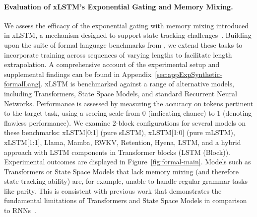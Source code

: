 \paragraph{Evaluation of xLSTM's Exponential Gating and Memory Mixing.} We assess the efficacy of the exponential gating with memory mixing introduced in xLSTM, a mechanism designed to support state tracking challenges~\citep{Merrill:24, Merrill:23}. Building upon the suite of formal language benchmarks from \citet{Deletang:23}, we extend these tasks to incorporate training across sequences of varying lengths to facilitate length extrapolation. A comprehensive account of the experimental setup and supplemental findings can be found in Appendix~\ref{sec:appExpSynthetic-formalLang}. xLSTM is benchmarked against a range of alternative models, including Transformers, State Space Models, and standard Recurrent Neural Networks. Performance is assessed by measuring the accuracy on tokens pertinent to the target task, using a scoring scale from 0 (indicating chance) to 1 (denoting flawless performance). We examine 2-block configurations for several models on these benchmarks: xLSTM[0:1] (pure sLSTM), xLSTM[1:0] (pure mLSTM), xLSTM[1:1], Llama, Mamba, RWKV, Retention, Hyena, LSTM, and a hybrid approach with LSTM components in Transformer blocks (LSTM (Block)). Experimental outcomes are displayed in Figure~\ref{fig:formal-main}. Models such as Transformers or State Space Models that lack memory mixing (and therefore state tracking ability) are, for example, unable to handle regular grammar tasks like parity. This is consistent with previous work that demonstrates the fundamental limitations of Transformers and State Space Models in comparison to RNNs~\citep{Merrill:24, Merrill:23, Deletang:23}.


